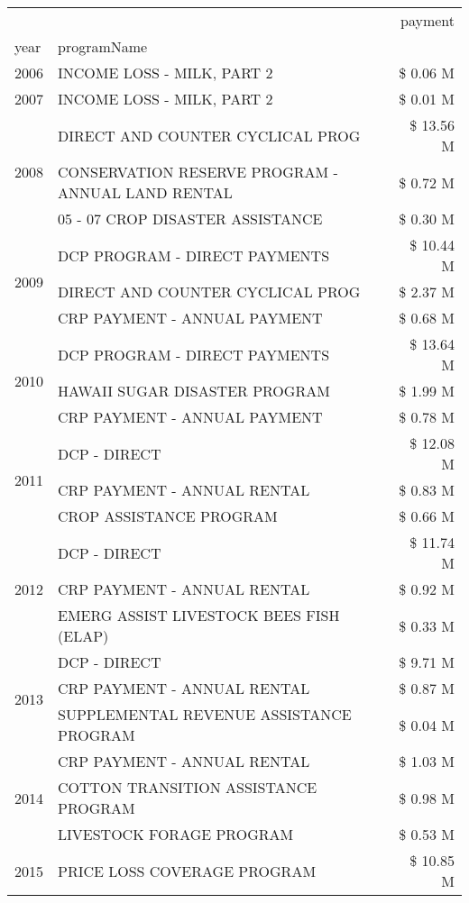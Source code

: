 \begin{tabular}{llr}
\toprule
 &  & payment \\
year & programName &  \\
\midrule
2006 & INCOME LOSS - MILK, PART 2 & \$ 0.06 M \\
\cline{1-3}
2007 & INCOME LOSS - MILK, PART 2 & \$ 0.01 M \\
\cline{1-3}
\multirow[t]{3}{*}{2008} & DIRECT AND COUNTER CYCLICAL PROG & \$ 13.56 M \\
 & CONSERVATION RESERVE PROGRAM - ANNUAL LAND RENTAL & \$ 0.72 M \\
 & 05 - 07 CROP DISASTER ASSISTANCE & \$ 0.30 M \\
\cline{1-3}
\multirow[t]{3}{*}{2009} & DCP PROGRAM - DIRECT PAYMENTS & \$ 10.44 M \\
 & DIRECT AND COUNTER CYCLICAL PROG & \$ 2.37 M \\
 & CRP PAYMENT - ANNUAL PAYMENT & \$ 0.68 M \\
\cline{1-3}
\multirow[t]{3}{*}{2010} & DCP PROGRAM - DIRECT PAYMENTS & \$ 13.64 M \\
 & HAWAII SUGAR DISASTER PROGRAM & \$ 1.99 M \\
 & CRP PAYMENT - ANNUAL PAYMENT & \$ 0.78 M \\
\cline{1-3}
\multirow[t]{3}{*}{2011} & DCP - DIRECT & \$ 12.08 M \\
 & CRP PAYMENT - ANNUAL RENTAL & \$ 0.83 M \\
 & CROP ASSISTANCE PROGRAM & \$ 0.66 M \\
\cline{1-3}
\multirow[t]{3}{*}{2012} & DCP - DIRECT & \$ 11.74 M \\
 & CRP PAYMENT - ANNUAL RENTAL & \$ 0.92 M \\
 & EMERG ASSIST LIVESTOCK BEES FISH (ELAP) & \$ 0.33 M \\
\cline{1-3}
\multirow[t]{3}{*}{2013} & DCP - DIRECT & \$ 9.71 M \\
 & CRP PAYMENT - ANNUAL RENTAL & \$ 0.87 M \\
 & SUPPLEMENTAL REVENUE ASSISTANCE PROGRAM & \$ 0.04 M \\
\cline{1-3}
\multirow[t]{3}{*}{2014} & CRP PAYMENT - ANNUAL RENTAL & \$ 1.03 M \\
 & COTTON TRANSITION ASSISTANCE PROGRAM & \$ 0.98 M \\
 & LIVESTOCK FORAGE PROGRAM & \$ 0.53 M \\
\cline{1-3}
\multirow[t]{3}{*}{2015} & PRICE LOSS COVERAGE PROGRAM & \$ 10.85 M \\

\end{tabular}

